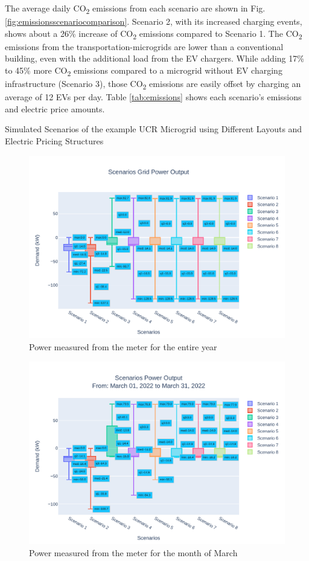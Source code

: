 \documentclass[conference]{IEEEtran}
\begin{document}
		The average daily CO\textsubscript{2} emissions from each scenario are shown in Fig. \ref{fig:emissionsscenariocomparison}. Scenario 2, with its increased charging events, shows about a 26\% increase of CO\textsubscript{2} emissions compared to Scenario 1. The CO\textsubscript{2} emissions from the transportation-microgrids are lower than a conventional building, even with the additional load from the EV chargers. While adding 17\% to 45\% more CO\textsubscript{2} emissions compared to a microgrid without EV charging infrastructure (Scenario 3), those CO\textsubscript{2} emissions are easily offset by charging an average of 12 EVs per day. Table \ref{tab:emissions} shows each scenario's emissions and electric price amounts.
	\begin{table}
		\caption{Simulated Scenarios of the example UCR Microgrid using Different Layouts and Electric Pricing Structures}
		\tiny
		
		\normalsize
		\label{tab:scenarios}
	\end{table}
	\begin{figure}
		\centering
		\includegraphics[width=0.9\linewidth]{Fig/scenarios_power_output_boxplot}
		\caption{Power measured from the meter for the entire year}
		\label{fig:scenariospoweroutputboxplot}
	\end{figure}
	\begin{figure}
		\centering
		\includegraphics[width=0.9\linewidth]{Fig/0_Scn_Output_Run_3_Mar_01_2022_to_Mar_31_2022}
		\caption{\footnotesize  Power measured from the meter for the month of March}
		\label{fig:0scnoutputrun2mar012022tomar312022}
	\end{figure}
\end{document}
